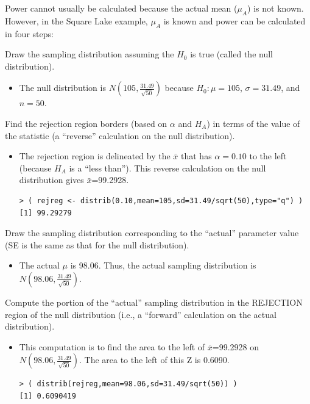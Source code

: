 \documentclass[10pt,openany]{book}\usepackage[]{graphicx}\usepackage[]{color}
\makeatletter
\newenvironment{kframe}{%
 \def\at@end@of@kframe{}%
 \ifinner\ifhmode%
  \def\at@end@of@kframe{\end{minipage}}%
  \begin{minipage}{\columnwidth}%
 \fi\fi%
 \def\FrameCommand##1{\hskip\@totalleftmargin \hskip-\fboxsep
 \colorbox{shadecolor}{##1}\hskip-\fboxsep
     \hskip-\linewidth \hskip-\@totalleftmargin \hskip\columnwidth}%
 \MakeFramed {\advance\hsize-\width
   \@totalleftmargin\z@ \linewidth\hsize
   \@setminipage}}%
 {\par\unskip\endMakeFramed%
 \at@end@of@kframe}
\newenvironment{knitrout}{}{} %
\makeatother
\begin{document}
Power cannot usually be calculated because the actual mean ($\mu_{A}$) is not known. However, in the Square Lake example, $\mu_{A}$ is known and power can be calculated in four steps:
\begin{Enumerate}
 \item Draw the sampling distribution assuming the $H_{0}$ is true (called the null distribution).
 \begin{itemize}
   \item The null distribution is $N(105,\frac{31.49}{\sqrt{50}})$ because $H_{0}:\mu=105$, $\sigma=31.49$, and $n=50$.
 \end{itemize}
 \item Find the rejection region borders (based on $\alpha$ and $H_{A}$) in terms of the value of the statistic (a ``reverse'' calculation on the null distribution).
 \begin{itemize}
   \item The rejection region is delineated by the $\bar{x}$ that has $\alpha=0.10$ to the left (because $H_{A}$ is a ``less than''). This reverse calculation on the null distribution gives $\bar{x}$=99.2928.
\begin{knitrout}
\color{fgcolor}\begin{kframe}
\begin{verbatim}
> ( rejreg <- distrib(0.10,mean=105,sd=31.49/sqrt(50),type="q") )
[1] 99.29279
\end{verbatim}
\end{kframe}
\end{knitrout}
 \end{itemize}
 \item Draw the sampling distribution corresponding to the ``actual'' parameter value (SE is the same as that for the null distribution).
 \begin{itemize}
   \item The actual $\mu$ is 98.06. Thus, the actual sampling distribution is $N(98.06,\frac{31.49}{\sqrt{50}})$.
 \end{itemize}
 \item Compute the portion of the ``actual'' sampling distribution in the REJECTION region of the null distribution (i.e., a ``forward'' calculation on the actual distribution).
 \begin{itemize}
   \item This computation is to find the area to the left of $\bar{x}$=99.2928 on $N(98.06,\frac{31.49}{\sqrt{50}})$. The area to the left of this Z is 0.6090.
\begin{knitrout}
\color{fgcolor}\begin{kframe}
\begin{verbatim}
> ( distrib(rejreg,mean=98.06,sd=31.49/sqrt(50)) )
[1] 0.6090419
\end{verbatim}
\end{kframe}
\end{knitrout}
 \end{itemize}
\end{Enumerate}
\end{document}
